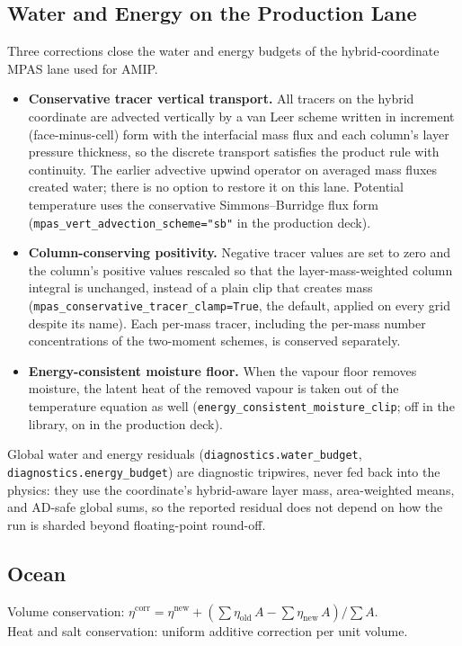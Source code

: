 \documentclass[11pt,a4paper]{article}
\begin{document}
\subsection{Water and Energy on the Production Lane}
\label{sec:conservation-v1}
Three corrections close the water and energy budgets of the hybrid-coordinate MPAS lane used for AMIP.
\begin{itemize}[nosep]
  \item \textbf{Conservative tracer vertical transport.}  All tracers on the hybrid coordinate are advected vertically by a van Leer scheme written in increment (face-minus-cell) form with the interfacial mass flux and each column's layer pressure thickness, so the discrete transport satisfies the product rule with continuity.  The earlier advective upwind operator on averaged mass fluxes created water; there is no option to restore it on this lane.  Potential temperature uses the conservative Simmons--Burridge flux form (\texttt{mpas\_vert\_advection\_scheme="sb"} in the production deck).
  \item \textbf{Column-conserving positivity.}  Negative tracer values are set to zero and the column's positive values rescaled so that the layer-mass-weighted column integral is unchanged, instead of a plain clip that creates mass (\texttt{mpas\_conservative\_tracer\_clamp=True}, the default, applied on every grid despite its name).  Each per-mass tracer, including the per-mass number concentrations of the two-moment schemes, is conserved separately.
  \item \textbf{Energy-consistent moisture floor.}  When the vapour floor removes moisture, the latent heat of the removed vapour is taken out of the temperature equation as well (\texttt{energy\_consistent\_moisture\_clip}; off in the library, on in the production deck).
\end{itemize}
Global water and energy residuals (\texttt{diagnostics.water\_budget}, \texttt{diagnostics.energy\_budget}) are diagnostic tripwires, never fed back into the physics: they use the coordinate's hybrid-aware layer mass, area-weighted means, and AD-safe global sums, so the reported residual does not depend on how the run is sharded beyond floating-point round-off.

\subsection{Ocean}
Volume conservation: $\eta^{\mathrm{corr}}=\eta^{\mathrm{new}}+(\sum\eta_{\mathrm{old}}\,A-\sum\eta_{\mathrm{new}}\,A)/\sum A$.\\
Heat and salt conservation: uniform additive correction per unit volume.
\end{document}
